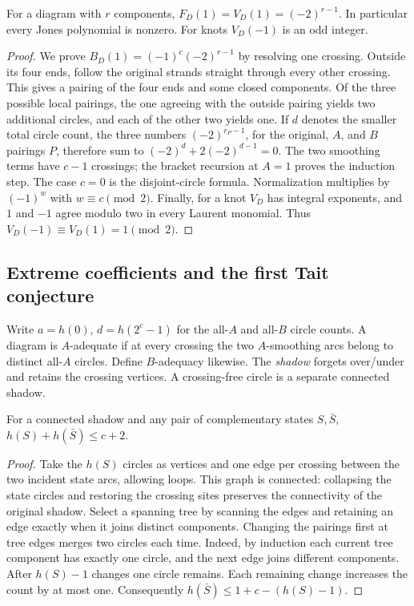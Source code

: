 \begin{proposition}
For a diagram with $r$ components,
$F_D(1)=V_D(1)=(-2)^{r-1}$. In particular every Jones polynomial is
nonzero. For knots $V_D(-1)$ is an odd integer.
\end{proposition}
\begin{proof}
We prove $B_D(1)=(-1)^c(-2)^{r-1}$ by resolving one crossing.
Outside its four ends, follow the original strands straight through every
other crossing. This gives a pairing of the four ends and some closed
components. Of the three possible local pairings, the one agreeing with
the outside pairing yields two additional circles, and each of the other
two yields one. If $d$ denotes the smaller total circle count,
the three numbers $(-2)^{r_P-1}$, for the original, $A$, and $B$
pairings $P$, therefore sum to
$(-2)^d+2(-2)^{d-1}=0$. The two smoothing terms have $c-1$ crossings;
the bracket recursion at $A=1$ proves the induction step. The case $c=0$
is the disjoint-circle formula. Normalization multiplies by $(-1)^w$
with $w\equiv c\pmod2$. Finally, for a knot $V_D$ has integral exponents,
and $1$ and $-1$ agree modulo two in every Laurent monomial. Thus
$V_D(-1)\equiv V_D(1)=1\pmod2$.
\end{proof}

\subsection{Extreme coefficients and the first Tait conjecture}

Write $a=h(0)$, $d=h(2^c-1)$ for the all-$A$ and all-$B$ circle counts.
A diagram is $A$-adequate if at every crossing the two $A$-smoothing arcs
belong to distinct all-$A$ circles. Define $B$-adequacy likewise. The
\emph{shadow} forgets over/under and retains the crossing vertices. A
crossing-free circle is a separate connected shadow.

\begin{lemma}
For a connected shadow and any pair of complementary states $S,\bar S$,
$h(S)+h(\bar S)\le c+2$.
\end{lemma}
\begin{proof}
Take the $h(S)$ circles as vertices and one edge per crossing between the
two incident state arcs, allowing loops. This graph is connected: collapsing
the state circles and restoring the crossing sites preserves the connectivity
of the original shadow. Select a spanning tree by scanning the edges and
retaining an edge exactly when it joins distinct components. Changing the
pairings first at tree edges merges two circles each time. Indeed, by
induction each current tree component has exactly one circle, and the next
edge joins different components. After $h(S)-1$ changes one circle remains.
Each remaining change increases the count by at most one. Consequently
$h(\bar S)\le1+c-(h(S)-1)$.
\end{proof}

